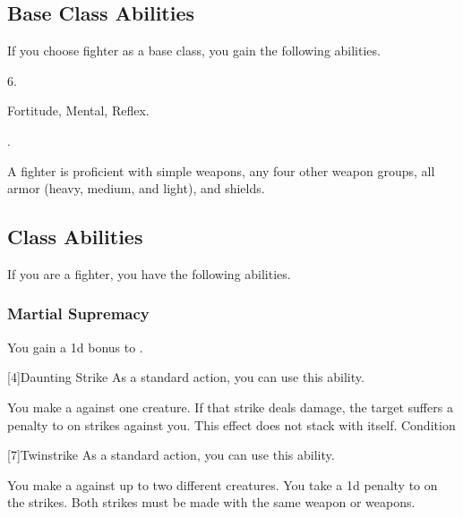     \subsection{Base Class Abilities}
        If you choose fighter as a base class, you gain the following abilities.

         6.

          Fortitude,  Mental,  Reflex.

         .

        A fighter is proficient with simple weapons, any four other weapon groups,  all armor (heavy, medium, and light), and shields.

    \subsection{Class Abilities}
        If you are a fighter, you have the following abilities.

        \subsubsection{Martial Supremacy}
             You gain a \plus1d bonus to .

            [4]{Daunting Strike} As a standard action, you can use this ability.
            \begin{ability}
                \begin{spelleffects}
                    \spelleffect You make a  against one creature.
                    If that strike deals damage, the target suffers a  penalty to  on strikes against you.
                    This effect does not stack with itself.
                    \spelldur Condition
                \end{spelleffects}
            \end{ability}

            [7]{Twinstrike} As a standard action, you can use this ability.
            \begin{ability}
                \begin{spelleffects}
                    \spelleffect You make a  against up to two different creatures.
                    You take a \minus1d penalty to  on the strikes.
                    Both strikes must be made with the same weapon or weapons.
                \end{spelleffects}
            \end{ability}

